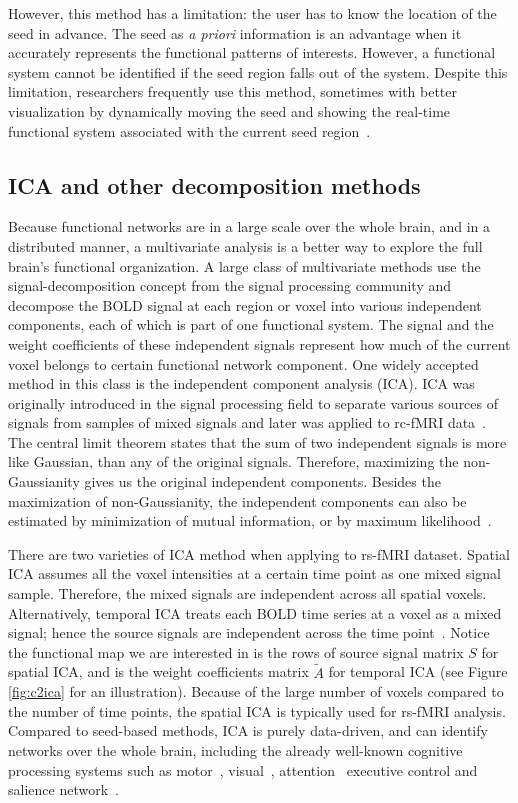 However, this method has a limitation: the user has to know the location of the
seed in advance. The seed as \emph{a priori} information is an advantage when it
accurately represents the functional patterns of interests. However, a
functional system cannot be identified if the seed region falls out of the
system.  Despite this limitation, researchers frequently use this method,
sometimes with better visualization by dynamically moving the seed and showing
the real-time functional system associated with the current seed
region~\cite{yeo2011organization}.

\subsection{ICA and other decomposition methods}
Because functional networks are in a large scale over the whole brain, and in
a distributed manner, a multivariate analysis is a better way to explore the
full brain's functional organization. A large class of multivariate methods
use the signal-decomposition concept from the signal processing community and
decompose the BOLD signal at each region or voxel into various independent
components, each of which is part of one functional system. The signal and the
weight coefficients of these independent signals represent how much of the
current voxel belongs to certain functional network component. One widely
accepted method in this class is the independent component analysis (ICA). ICA
was originally introduced in the signal processing field to separate various
sources of signals from samples of mixed signals and later was applied to
rc-fMRI data~\cite{nggroup2012, beckmann2005tensorial,
  damoiseaux2006consistent}. The central limit theorem states that the sum of
two independent signals is more like Gaussian, than any of the original
signals. Therefore, maximizing the non-Gaussianity gives us the original
independent components. Besides the maximization of non-Gaussianity, the
independent components can also be estimated by minimization of mutual
information, or by maximum likelihood~\cite{hyvarinen2000independent}.

There are two varieties of ICA method when applying to rs-fMRI dataset. Spatial
ICA assumes all the voxel intensities at a certain time point as one mixed signal
sample. Therefore, the mixed signals are independent across all spatial
voxels. Alternatively, temporal ICA treats each BOLD time series at a voxel as a
mixed signal; hence the source signals are independent across the time
point~\cite{calhoun2001spatial}. Notice the functional map we are interested in
is the rows of source signal matrix $S$ for spatial ICA, and is the weight
coefficients matrix $\tilde A$ for temporal ICA (see Figure \ref{fig:c2ica} for
an illustration). Because of the large number of voxels compared to the number of
time points, the spatial ICA is typically used for rs-fMRI analysis. Compared to
seed-based methods, ICA is purely data-driven, and can identify networks over
the whole brain, including the already well-known cognitive processing systems
such as motor~\cite{biswal1995functional},
visual~\cite{damoiseaux2006consistent}, attention~\cite{fox2006spontaneous}
executive control and salience network~\cite{seeley2007dissociable,
  seeley2009neurodegenerative}.

